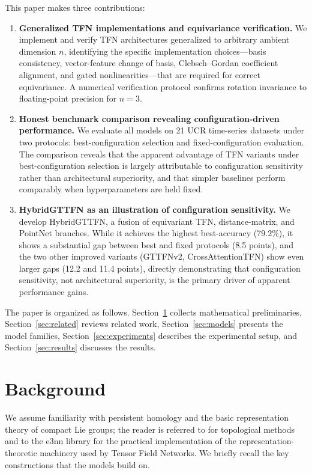 \documentclass[a4paper,11pt]{article}
\begin{document}
This paper makes three contributions:
\begin{enumerate}
    \item \textbf{Generalized TFN implementations and equivariance verification.}
    We implement and verify TFN architectures generalized to arbitrary ambient dimension $n$, identifying the specific implementation choices---basis consistency, vector-feature change of basis, Clebsch--Gordan coefficient alignment, and gated nonlinearities---that are required for correct equivariance.
    A numerical verification protocol confirms rotation invariance to floating-point precision for $n=3$.
    \item \textbf{Honest benchmark comparison revealing configuration-driven performance.}
    We evaluate all models on 21 UCR time-series datasets under two protocols: best-configuration selection and fixed-configuration evaluation.
    The comparison reveals that the apparent advantage of TFN variants under best-configuration selection is largely attributable to configuration sensitivity rather than architectural superiority, and that simpler baselines perform comparably when hyperparameters are held fixed.
    \item \textbf{HybridGTTFN as an illustration of configuration sensitivity.}
    We develop HybridGTTFN, a fusion of equivariant TFN, distance-matrix, and PointNet branches.
    While it achieves the highest best-accuracy (79.2\%), it shows a substantial gap between best and fixed protocols (8.5 points), and the two other improved variants (GTTFNv2, CrossAttentionTFN) show even larger gaps (12.2 and 11.4 points), directly demonstrating that configuration sensitivity, not architectural superiority, is the primary driver of apparent performance gains.
\end{enumerate}

The paper is organized as follows.
Section~\ref{sec:background} collects mathematical preliminaries, Section~\ref{sec:related} reviews related work, Section~\ref{sec:models} presents the model families, Section~\ref{sec:experiments} describes the experimental setup, and Section~\ref{sec:results} discusses the results.

\section{Background} \label{sec:background}

We assume familiarity with persistent homology and the basic representation theory of compact Lie groups; the reader is referred to \cite{hensel2021survey} for topological methods and to the e3nn library \cite{e3nn2022} for the practical implementation of the representation-theoretic machinery used by Tensor Field Networks.
We briefly recall the key constructions that the models build on.
\end{document}
